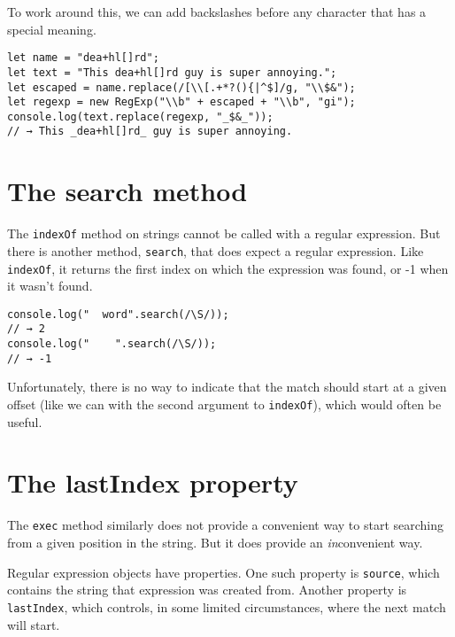 To work around this, we can add backslashes before any character that has a special meaning.

\begin{lstlisting}
let name = "dea+hl[]rd";
let text = "This dea+hl[]rd guy is super annoying.";
let escaped = name.replace(/[\\[.+*?(){|^$]/g, "\\$&");
let regexp = new RegExp("\\b" + escaped + "\\b", "gi");
console.log(text.replace(regexp, "_$&_"));
// → This _dea+hl[]rd_ guy is super annoying.
\end{lstlisting}
\noindent

\section{The search method}

The \lstinline`indexOf` method on strings cannot be called with a regular expression. But there is another method, \lstinline`search`, that does expect a regular expression. Like \lstinline`indexOf`, it returns the first index on which the expression was found, or -1 when it wasn't found.

\begin{lstlisting}
console.log("  word".search(/\S/));
// → 2
console.log("    ".search(/\S/));
// → -1
\end{lstlisting}
\noindent

Unfortunately, there is no way to indicate that the match should start at a given offset (like we can with the second argument to \lstinline`indexOf`), which would often be useful.

\section{The lastIndex property}

The \lstinline`exec` method similarly does not provide a convenient way to start searching from a given position in the string. But it does provide an \emph{in}convenient way.

Regular expression objects have properties. One such property is \lstinline`source`, which contains the string that expression was created from. Another property is \lstinline`lastIndex`, which controls, in some limited circumstances, where the next match will start.

